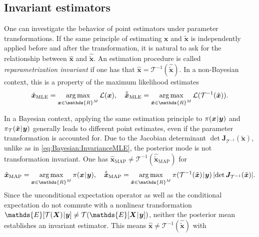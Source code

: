 \subsection{Invariant estimators}
One can investigate the behavior of point estimators under parameter transformations.
If the same principle of estimating \(\bm{x}\) and \(\tilde{\bm{x}}\) is independently applied before and after the transformation,
it is natural to ask for the relationship between \(\hat{\bm{x}}\) and \(\hat{\tilde{\bm{x}}}\).
An estimation procedure is called \emph{reparametrization invariant} if one has that \(\hat{\bm{x}} = \mathcal{T}^{-1}(\hat{\tilde{\bm{x}}})\).
In a non-Bayesian context, this is a property of the maximum likelihood estimates
\begin{equation} \label{eq:Bayesian:InvarianceMLE}
  \hat{\bm{x}}_{\mathrm{MLE}} = \operatorname*{arg\,max}_{\bm{x} \in \mathds{R}^\dimParam} \mathcal{L}(\bm{x}), \quad
  \hat{\tilde{\bm{x}}}_{\mathrm{MLE}} = \operatorname*{arg\,max}_{\tilde{\bm{x}} \in \mathds{R}^\dimParam} \mathcal{L}(\mathcal{T}^{-1}(\tilde{\bm{x}})).
\end{equation}
\par %
In a Bayesian context, applying the same estimation principle to \(\pi(\bm{x} {\:\!}|{\:\!} \bm{y})\) and \(\pi_{\mathcal{T}}(\tilde{\bm{x}} {\:\!}|{\:\!} \bm{y})\)
generally leads to different point estimates, even if the parameter transformation is accounted for.
Due to the Jacobian determinant \(\det \bm{J}_{\mathcal{T}^{-1}}(\tilde{\bm{x}})\), unlike as in \cref{eq:Bayesian:InvarianceMLE}, the posterior mode is not transformation invariant.
One has \(\hat{\bm{x}}_{\mathrm{MAP}} \neq \mathcal{T}^{-1}(\hat{\tilde{\bm{x}}}_{\mathrm{MAP}})\) for
\begin{equation} \label{eq:Bayesian:InvarianceMAP}
  \hat{\bm{x}}_{\mathrm{MAP}} = \operatorname*{arg\,max}_{\bm{x} \in \mathds{R}^\dimParam} \pi(\bm{x} \cond \bm{y}), \quad
  \hat{\tilde{\bm{x}}}_{\mathrm{MAP}} = \operatorname*{arg\,max}_{\tilde{\bm{x}} \in \mathds{R}^\dimParam}
  \pi(\mathcal{T}^{-1}(\tilde{\bm{x}}) \cond \bm{y}) \, \lvert \det \bm{J}_{\mathcal{T}^{-1}}(\tilde{\bm{x}}) \rvert.
\end{equation}
Since the unconditional expectation operator as well as the conditional expectation do not commute with a nonlinear transformation
\(\mathds{E}[\mathcal{T}(\bm{X}) \cond \bm{y}] \neq \mathcal{T}(\mathds{E}[\bm{X} \cond \bm{y}])\), neither the posterior mean establishes an invariant estimator.
This means \(\hat{\bm{x}} \neq \mathcal{T}^{-1}(\hat{\tilde{\bm{x}}})\) with
